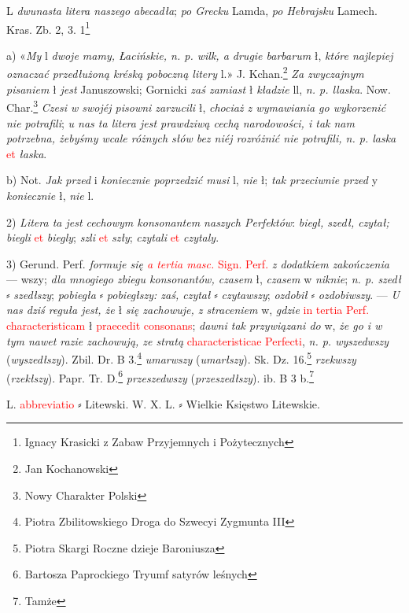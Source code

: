 \documentclass[12pt]{article}
\begin{document}
\begin{description}
\item L \textit{dwunasta litera naszego abecadła}; \textit{po Grecku} {\color{yellow} Lamda}, \textit{po Hebrajsku} {\color{blue} Lamech}. Kras. Zb. 2, 3. 1\footnote{Ignacy Krasicki z Zabaw Przyjemnych i Pożytecznych}

a) «\textit{My} l \textit{dwoje  mamy, Łacińskie, n. p. wilk, a drugie barbarum} ł, \textit{które najlepiej oznaczać przedłużoną kréską poboczną litery} l.» J. Kchan.\footnote{Jan Kochanowski}
\textit{Za zwyczajnym pisaniem} ł \textit{jest} Januszowski; 
Gornicki \textit{zaś zamiast} ł \textit{kładzie} ll, \textit{n. p. llaska}. Now. Char.\footnote{Nowy Charakter Polski} 
\textit{Czesi w swojéj pisowni zarzucili} ł, \textit{chociaż z wymawiania go wykorzenić nie potrafili}; \textit{u nas ta litera jest prawdziwą cechą narodowości, i tak nam potrzebna, żebyśmy wcale różnych słów bez niéj rozróżnić nie potrafili, n. p. laska} \textcolor{red}{et} \textit{łaska}. 

b) Not. \textit{Jak przed} i \textit{koniecznie poprzedzić musi} l, \textit{nie} ł; \textit{tak przeciwnie przed} y \textit{koniecznie} ł, \textit{nie} l. 

\item 2) \textit{Litera ta jest cechowym konsonantem naszych Perfektów}: 
\textit{biegł, szedł, czytał; biegli} \textcolor{red}{et} \textit{biegly}; 
\textit{szli} \textcolor{red}{et} \textit{szły}; \textit{czytali} \textcolor{red}{et} \textit{czytaly}.  
 
\item 3) {\color {red} Gerund. Perf.} \textit{formuje się \textcolor{red}{a tertia masc.}} 
\textcolor{red}{Sign. Perf.} \textit{z dodatkiem zakończenia} — wszy; \textit{dla mnogiego zbiegu konsonantów, czasem} ł, \textit{czasem} w \textit{niknie}; 
\textit{n. p. szedł} ⸗ \textit{szedłszy}; \textit{pobiegła} ⸗ \textit{pobiegłszy: zaś, czytał} ⸗ \textit{czytawszy}; \textit{ozdobił} ⸗ \textit{ozdobiwszy}. 
— \textit{U nas dziś reguła jest, że} ł \textit{się zachowuje, z straceniem} w, \textit{gdzie} \textcolor{red}{in tertia Perf. characteristicam} ł \textcolor{red}{praecedit consonans}; \textit{dawni tak przywiązani do} w, \textit{że go i w tym nawet razie zachowują, ze stratą} \textcolor{red}{characteristicae Perfecti}, \textit{n. p. wyszedwszy} (\textit{wyszedłszy}). Zbil. Dr. B 3.\footnote{Piotra Zbilitowskiego Droga do Szwecyi Zygmunta III} \textit{umarwszy} (\textit{umarłszy}). Sk. Dz. 16.\footnote{Piotra Skargi Roczne dzieje Baroniusza} \textit{rzekwszy} (\textit{rzekłszy}). Papr. Tr. D.\footnote{Bartosza Paprockiego Tryumf satyrów leśnych} \textit{przeszedwszy} (\textit{przeszedłszy}). ib. B 3 b.\footnote{Tamże}


\item L. \textcolor{red}{abbreviatio} ⸗ Litewski. W. X. L. ⸗ Wielkie Księstwo Litewskie.

\end{description}
\end{document}
